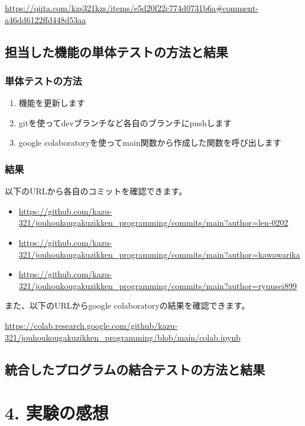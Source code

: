 \documentclass[a4paper,11pt]{jsarticle}
\begin{document}
\url{https://qiita.com/kzs321kzs/items/e5d20f22c774d0731b6a#comment-a46dd6122ffd448d53aa}

\newpage

\subsection*{担当した機能の単体テストの方法と結果}
\subsubsection*{単体テストの方法}
\begin{enumerate}
    \item 機能を更新します
    \item gitを使ってdevブランチなど各自のブランチにpushします
    \item google colaboratoryを使ってmain関数から作成した関数を呼び出します
\end{enumerate}

\subsubsection*{結果}
以下のURLから各自のコミットを確認できます。
\begin{itemize}
    \item \url{https://github.com/kazu-321/jouhoukougakuzikken_programming/commits/main?author=len-0202}
    \item \url{https://github.com/kazu-321/jouhoukougakuzikken_programming/commits/main?author=kawawarika}
    \item \url{https://github.com/kazu-321/jouhoukougakuzikken_programming/commits/main?author=ryuusei899}
\end{itemize}

また、以下のURLからgoogle colaboratoryの結果を確認できます。

\url{https://colab.research.google.com/github/kazu-321/jouhoukougakuzikken_programming/blob/main/colab.ipynb}

\subsection*{統合したプログラムの結合テストの方法と結果}



\section*{4. 実験の感想}
\end{document}
